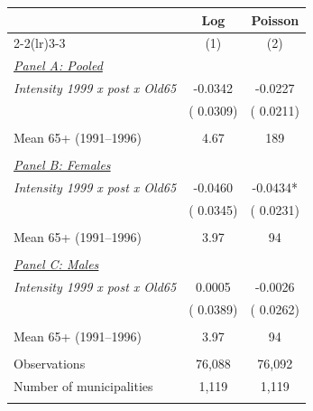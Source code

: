 \begin{tabular}{lcc} \hline \hline
& Log & Poisson \\ 
\cmidrule(lr){2-2}\cmidrule(lr){3-3}
& \multicolumn{1}{c}{(1)} & \multicolumn{1}{c}{(2)} \\ \toprule
\underline{\textit{Panel A: Pooled}}  \\ 
\textit{Intensity 1999 x post x Old65} &      -0.0342 &      -0.0227 \\ 
  & (      0.0309) & (      0.0211) \\ 
  & &  \\ 
Mean 65+ (1991--1996)  &         4.67 &          189 \\ 
  & &  \\ 
\underline{\textit{Panel B: Females}}  \\ 
\textit{Intensity 1999 x post x Old65}  &      -0.0460 &      -0.0434* \\ 
  & (      0.0345) & (      0.0231) \\ 
  & &  \\ 
Mean 65+ (1991--1996)  &         3.97 &           94 \\ 
  & &  \\ 
\underline{\textit{Panel C: Males}}  \\ 
\textit{Intensity 1999 x post x Old65} &       0.0005 &      -0.0026 \\ 
  & (      0.0389) & (      0.0262) \\ 
  & &  \\ 
Mean 65+ (1991--1996) &         3.97 &           94 \\ 
  & &  \\ 
Observations &       76,088 &       76,092 \\ 
Number of municipalities &        1,119 &        1,119 \\ 
  & & \\ 
\bottomrule
\end{tabular}
